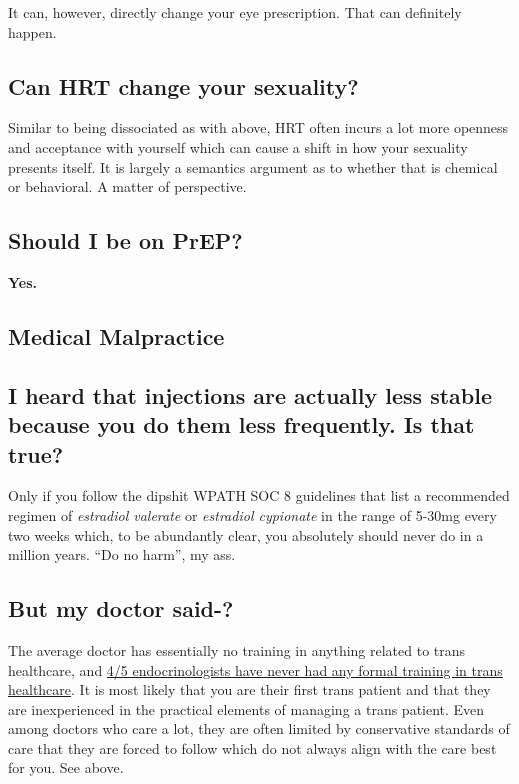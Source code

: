 \documentclass{article}
\begin{document}
It can, however, directly change your eye prescription. That can definitely happen.

\subsection{Can HRT change your sexuality?}

Similar to being dissociated as with above, HRT often incurs a lot more openness and acceptance with yourself which can cause a shift in how your sexuality presents itself. It is largely a semantics argument as to whether that is chemical or behavioral. A matter of perspective. 

\subsection{Should I be on PrEP?}

\textbf{Yes.}

\subsection*{Medical Malpractice}

\subsection{I heard that injections are actually less stable because you do them less frequently. Is that true?}

Only if you follow the dipshit WPATH SOC 8 guidelines that list a recommended regimen of \textit{estradiol valerate} or \textit{estradiol cypionate} in the range of 5-30mg every two weeks which, to be abundantly clear, you absolutely should never do in a million years. “Do no harm”, my ass. 

\subsection{But my doctor said-?}

The average doctor has essentially no training in anything related to trans healthcare, and \href{https://www.endocrine.org/news-and-advocacy/news-room/2017/endocrinologists-want-training-in-transgender-care }{4/5 endocrinologists have never had any formal training in trans healthcare}. It is most likely that you are their first trans patient and that they are inexperienced in the practical elements of managing a trans patient. Even among doctors who care a lot, they are often limited by conservative standards of care that they are forced to follow which do not always align with the care best for you. See above.
\end{document}
